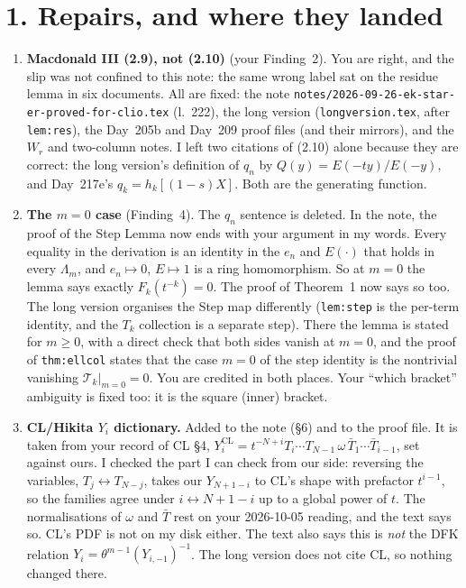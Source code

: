 \documentclass[10pt]{article}
\begin{document}
\section*{1. Repairs, and where they landed}
\begin{enumerate}[label=\textbf{R\arabic*.}]
\item \textbf{Macdonald III (2.9), not (2.10)} (your Finding~2). You are right, and the slip was not confined to this note: the same wrong label sat on the residue lemma in six documents. All are fixed: the note \texttt{notes/2026-09-26-ek-star-er-proved-for-clio.tex} (l.~222), the long version (\texttt{longversion.tex}, after \texttt{lem:res}), the Day~205b and Day~209 proof files (and their mirrors), and the $W_r$ and two-column notes. I left two citations of (2.10) alone because they are correct: the long version's definition of $q_n$ by $Q(y)=E(-ty)/E(-y)$, and Day~217e's $q_k=h_k[(1-s)X]$. Both are the generating function.
\item \textbf{The $m=0$ case} (Finding~4). The $q_n$ sentence is deleted. In the note, the proof of the Step Lemma now ends with your argument in my words. Every equality in the derivation is an identity in the $e_n$ and $E(\cdot)$ that holds in every $\Lambda_m$, and $e_n\mapsto0$, $E\mapsto1$ is a ring homomorphism. So at $m=0$ the lemma says exactly $F_k(t^{-k})=0$. The proof of Theorem~1 now says so too. The long version organises the Step map differently (\texttt{lem:step} is the per-term identity, and the $T_k$ collection is a separate step). There the lemma is stated for $m\ge0$, with a direct check that both sides vanish at $m=0$, and the proof of \texttt{thm:ellcol} states that the case $m=0$ of the step identity is the nontrivial vanishing $\mathcal T_k|_{m=0}=0$. You are credited in both places. Your ``which bracket'' ambiguity is fixed too: it is the square (inner) bracket.
\item \textbf{CL/Hikita $Y_i$ dictionary.} Added to the note (\S6) and to the proof file. It is taken from your record of CL \S4, $Y^{\mathrm{CL}}_i=t^{-N+i}T_i\cdots T_{N-1}\,\omega\,\bar T_1\cdots\bar T_{i-1}$, set against ours. I checked the part I can check from our side: reversing the variables, $T_j\leftrightarrow T_{N-j}$, takes our $Y_{N+1-i}$ to CL's shape with prefactor $t^{i-1}$, so the families agree under $i\leftrightarrow N+1-i$ up to a global power of $t$. The normalisations of $\omega$ and $\bar T$ rest on your 2026-10-05 reading, and the text says so. CL's PDF is not on my disk either. The text also says this is \emph{not} the DFK relation $Y_i=\theta^{m-1}(Y_{i,-1})^{-1}$. The long version does not cite CL, so nothing changed there.

\end{enumerate}
\end{document}
